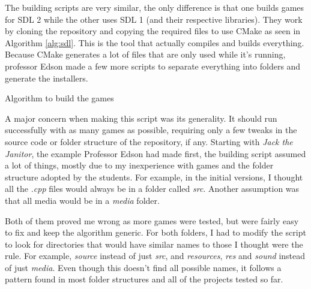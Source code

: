 The building scripts are very similar, the only difference is that one builds games for SDL 2 while the other uses SDL 1 (and their respective libraries). They work by cloning the repository and copying the required files to use CMake as seen in Algorithm \ref{alg:sdl}. This is the tool that actually compiles and builds everything. Because CMake generates a lot of files that are only used while it's running, professor Edson made a few more scripts to separate everything into folders and generate the installers.

\begin{algorithm}[h!]
\caption{Algorithm to build the games}
\label{alg:sdl}
\begin{algorithmic}
\Start
{}  
\State {} 
 
 
\State {} 
\State {} 
\State {} 
\State {} 
\End
\end{algorithmic}
\end{algorithm}

A major concern when making this script was its generality. It should run successfully with as many games as possible, requiring only a few tweaks in the source code or folder structure of the repository, if any. Starting with \textit{Jack the Janitor}, the example Professor Edson had made first, the  building script assumed a lot of things, mostly due to my inexperience with games and the folder structure adopted by the students. For example, in the initial versions, I thought all the \textit{.cpp} files would always be in a folder called \textit{src}. Another assumption was that all media would be in a \textit{media} folder.

Both of them proved me wrong as more games were tested, but were fairly easy to fix and keep the algorithm generic. For both folders, I had to modify the script to look for directories that would have similar names to those I thought were the rule. For example, \textit{source} instead of just \textit{src}, and \textit{resources}, \textit{res} and \textit{sound} instead of just \textit{media}. Even though this doesn't find all possible names, it follows a pattern found in most folder structures and all of the projects tested so far.

